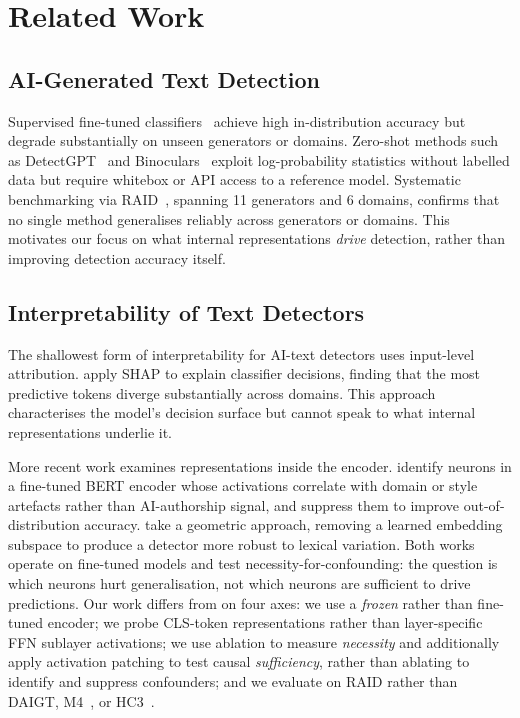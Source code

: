 \documentclass[11pt]{article}
\begin{document}
\section{Related Work}
\label{sec:related}

\subsection{AI-Generated Text Detection}

Supervised fine-tuned classifiers~\citep{solaiman2019release, zellers2019grover} achieve high in-distribution accuracy but degrade substantially on unseen generators or domains. Zero-shot methods such as DetectGPT~\citep{mitchell2023detectgpt} and Binoculars~\citep{hans2024binoculars} exploit log-probability statistics without labelled data but require whitebox or API access to a reference model. Systematic benchmarking via RAID~\citep{dugan2024raid}, spanning 11 generators and 6 domains, confirms that no single method generalises reliably across generators or domains. This motivates our focus on what internal representations \textit{drive} detection, rather than improving detection accuracy itself.

\subsection{Interpretability of Text Detectors}

The shallowest form of interpretability for AI-text detectors uses input-level attribution. \citet{pudasaini2026why} apply SHAP to explain classifier decisions, finding that the most predictive tokens diverge substantially across domains. This approach characterises the model's decision surface but cannot speak to what internal representations underlie it.

More recent work examines representations inside the encoder. \citet{borile2025confounding} identify neurons in a fine-tuned BERT encoder whose activations correlate with domain or style artefacts rather than AI-authorship signal, and suppress them to improve out-of-distribution accuracy. \citet{kuznetsov2024restricted} take a geometric approach, removing a learned embedding subspace to produce a detector more robust to lexical variation. Both works operate on fine-tuned models and test necessity-for-confounding: the question is which neurons hurt generalisation, not which neurons are sufficient to drive predictions. Our work differs from \citet{borile2025confounding} on four axes: we use a \textit{frozen} rather than fine-tuned encoder; we probe CLS-token representations rather than layer-specific FFN sublayer activations; we use ablation to measure \textit{necessity} and additionally apply activation patching to test causal \textit{sufficiency}, rather than ablating to identify and suppress confounders; and we evaluate on RAID rather than DAIGT, M4~\citep{wang2024m4}, or HC3~\citep{guo2023hc3}.
\end{document}
